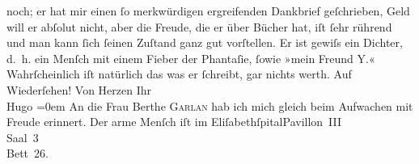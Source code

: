 \begin{ledgroupsized}[t]{13cm}
               noch; er hat mir einen ſo merkwürdigen ergreifenden Dankbrief geſchrieben, Geld will
               er abſolut nicht, aber die Freude, die er über Bücher hat, {\pb}iſt ſehr rührend und man kann ſich
               ſeinen Zuſtand ganz gut vorſtellen.\pend
           \pstart
           Er ist gewiſs ein Dichter, d. h. ein Menſch mit einem Fieber der Phantaſie, ſowie
                  »mein Freund Y.«\pend
           \pstart
           Wahrſcheinlich iſt natürlich das was er ſchreibt, gar nichts werth. Auf
               Wiederſehen!\pend
           \pstart
           {\pb}Von Herzen Ihr{\\[\baselineskip]}\spacefill\mbox{Hugo}\pend
           \leftskip=0em{}\pstart
           \noindent{}An die Frau Berthe{ }\textsc{Garlan} hab ich mich gleich beim Aufwachen mit Freude erinnert.\pend
           \pstart
           Der arme Menſch iſt im
                     EliſabethſpitalPavillon III{\\}Saal 3{\\}Bett 26.\pend
           
         
         \endnumbering{}\end{ledgroupsized}  \newcommand{\dateiname}{L01092}\newcommand{\titel}{Hugo von Hofmannsthal an Arthur Schnitzler, [17. 1. 1901]}\newcommand{\editorInnen}{Martin Anton Müller und Gerd-Hermann Susen}
      